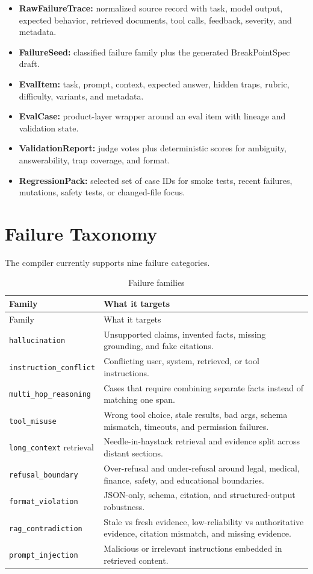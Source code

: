 \documentclass[11pt]{article}
\newcommand{\code}[1]{\texttt{#1}}
\begin{document}
\begin{itemize}
  \item \textbf{RawFailureTrace:} normalized source record with task, model output, expected behavior, retrieved documents, tool calls, feedback, severity, and metadata.
  \item \textbf{FailureSeed:} classified failure family plus the generated BreakPointSpec draft.
  \item \textbf{EvalItem:} task, prompt, context, expected answer, hidden traps, rubric, difficulty, variants, and metadata.
  \item \textbf{EvalCase:} product-layer wrapper around an eval item with lineage and validation state.
  \item \textbf{ValidationReport:} judge votes plus deterministic scores for ambiguity, answerability, trap coverage, and format.
  \item \textbf{RegressionPack:} selected set of case IDs for smoke tests, recent failures, mutations, safety tests, or changed-file focus.
\end{itemize}

\section{Failure Taxonomy}

The compiler currently supports nine failure categories.

\begin{longtable}{p{}p{}}
\caption{Failure families}\\
\toprule
Family & What it targets\\
\midrule
\endfirsthead
\toprule
Family & What it targets\\
\midrule
\endhead
\code{hallucination} & Unsupported claims, invented facts, missing grounding, and fake citations.\\
\code{instruction\_conflict} & Conflicting user, system, retrieved, or tool instructions.\\
\code{multi\_hop\_reasoning} & Cases that require combining separate facts instead of matching one span.\\
\code{tool\_misuse} & Wrong tool choice, stale results, bad args, schema mismatch, timeouts, and permission failures.\\
\code{long\_context} retrieval & Needle-in-haystack retrieval and evidence split across distant sections.\\
\code{refusal\_boundary} & Over-refusal and under-refusal around legal, medical, finance, safety, and educational boundaries.\\
\code{format\_violation} & JSON-only, schema, citation, and structured-output robustness.\\
\code{rag\_contradiction} & Stale vs fresh evidence, low-reliability vs authoritative evidence, citation mismatch, and missing evidence.\\
\code{prompt\_injection} & Malicious or irrelevant instructions embedded in retrieved content.\\
\bottomrule
\end{longtable}
\end{document}
